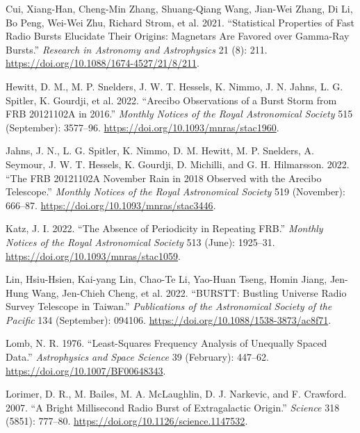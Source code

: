 \documentclass[
  rmp,
  amsmath,
  amssymb,
  preprint]{revtex4-2}
\newlength{\cslhangindent}
\newlength{\cslentryspacingunit} %
\newenvironment{CSLReferences}[2] %
 {%
  \setlength{\parindent}{0pt}
  \ifodd #1
  \let\oldpar\par
  \def\par{\hangindent=\cslhangindent\oldpar}
  \fi
  \setlength{\parskip}{#2\cslentryspacingunit}
 }%
 {}
\begin{document}
\begin{CSLReferences}{1}{0}
\leavevmode{}%
Cui, Xiang-Han, Cheng-Min Zhang, Shuang-Qiang Wang, Jian-Wei Zhang, Di
Li, Bo Peng, Wei-Wei Zhu, Richard Strom, et al. 2021. {``Statistical
Properties of Fast Radio Bursts Elucidate Their Origins: Magnetars Are
Favored over Gamma-Ray Bursts.''} \emph{Research in Astronomy and
Astrophysics} 21 (8): 211.
\url{https://doi.org/10.1088/1674-4527/21/8/211}.

\leavevmode{}%
Hewitt, D. M., M. P. Snelders, J. W. T. Hessels, K. Nimmo, J. N. Jahns,
L. G. Spitler, K. Gourdji, et al. 2022. {``Arecibo Observations of a
Burst Storm from {FRB 20121102A} in 2016.''} \emph{Monthly Notices of
the Royal Astronomical Society} 515 (September): 3577--96.
\url{https://doi.org/10.1093/mnras/stac1960}.

\leavevmode{}%
Jahns, J. N., L. G. Spitler, K. Nimmo, D. M. Hewitt, M. P. Snelders, A.
Seymour, J. W. T. Hessels, K. Gourdji, D. Michilli, and G. H.
Hilmarsson. 2022. {``The {FRB 20121102A November} Rain in 2018 Observed
with the {Arecibo Telescope}.''} \emph{Monthly Notices of the Royal
Astronomical Society} 519 (November): 666--87.
\url{https://doi.org/10.1093/mnras/stac3446}.

\leavevmode{}%
Katz, J. I. 2022. {``The Absence of Periodicity in Repeating {FRB}.''}
\emph{Monthly Notices of the Royal Astronomical Society} 513 (June):
1925--31. \url{https://doi.org/10.1093/mnras/stac1059}.

\leavevmode{}%
Lin, Hsiu-Hsien, Kai-yang Lin, Chao-Te Li, Yao-Huan Tseng, Homin Jiang,
Jen-Hung Wang, Jen-Chieh Cheng, et al. 2022. {``{BURSTT}: {Bustling
Universe Radio Survey Telescope} in {Taiwan}.''} \emph{Publications of
the Astronomical Society of the Pacific} 134 (September): 094106.
\url{https://doi.org/10.1088/1538-3873/ac8f71}.

\leavevmode{}%
Lomb, N. R. 1976. {``Least-{Squares Frequency Analysis} of {Unequally
Spaced Data}.''} \emph{Astrophysics and Space Science} 39 (February):
447--62. \url{https://doi.org/10.1007/BF00648343}.

\leavevmode{}%
Lorimer, D. R., M. Bailes, M. A. McLaughlin, D. J. Narkevic, and F.
Crawford. 2007. {``A Bright Millisecond Radio Burst of Extragalactic
Origin.''} \emph{Science} 318 (5851): 777--80.
\url{https://doi.org/10.1126/science.1147532}.


\end{CSLReferences}
\end{document}

